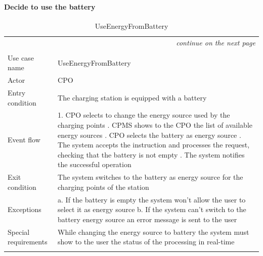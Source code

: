 \paragraph{Decide to use the battery}
\begin{center}
    \begin{longtable}{p{4cm} p{11cm}}
    \multicolumn{2}{r}{\itshape{continue on the next page}}\\
    \endfoot 
    \\
    \endlastfoot
    \hline
     Use case name &  UseEnergyFromBattery\\
     \hline
     Actor & CPO \\
     \hline
     Entry condition & The charging station is equipped with a battery \\
     \hline
     Event flow &
        1. CPO selects to change the energy source used by the charging points \newline
        2. CPMS shows to the CPO the list of available energy sources \newline
        3. CPO selects the battery as energy source \newline
        4. The system accepts the instruction and processes the request, checking that the battery is not empty \newline
        5. The system notifies the successful operation
     \\
     \hline
     Exit condition &  The system switches to the battery as energy source for the charging points of the station\\
     \hline
     Exceptions & 
        a. If the battery is empty the system won't allow the user to select it as energy source \newline
        b. If the system can't switch to the battery energy source an error message is sent to the user\\
     \hline
     Special requirements &
        While changing the energy source to battery the system must show to the user the status of the processing in real-time \\
     \hline
    \caption{UseEnergyFromBattery}
    \label{tab:UseEnergyFromBattery}
    \end{longtable}
\end{center}

\clearpage
